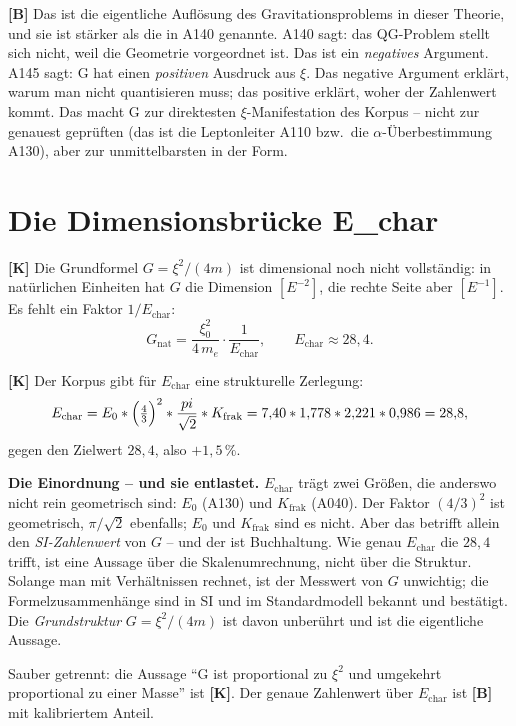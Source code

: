 \textbf{[B]} Das ist die eigentliche Auflösung des Gravitationsproblems in
dieser Theorie, und sie ist stärker als die in A140 genannte. A140 sagt: das
QG-Problem stellt sich nicht, weil die Geometrie vorgeordnet ist. Das ist ein
\emph{negatives} Argument. A145 sagt: G hat einen \emph{positiven} Ausdruck aus
$\xi$. Das negative Argument erklärt, warum man nicht quantisieren muss; das
positive erklärt, woher der Zahlenwert kommt. Das macht G zur direktesten
$\xi$-Manifestation des Korpus -- nicht zur genauest geprüften (das ist die
Leptonleiter A110 bzw.\ die $\alpha$-Überbestimmung A130), aber zur
unmittelbarsten in der Form.

\section{Die Dimensionsbrücke E\_char}

\textbf{[K]} Die Grundformel $G=\xi^2/(4m)$ ist dimensional noch nicht
vollständig: in natürlichen Einheiten hat $G$ die Dimension $[E^{-2}]$, die
rechte Seite aber $[E^{-1}]$. Es fehlt ein Faktor $1/E_\text{char}$:
\[
  G_\text{nat} = \frac{\xi_0^2}{4\,m_e}\cdot\frac{1}{E_\text{char}},
  \qquad E_\text{char}\approx 28{,}4 .
\]

\textbf{[K]} Der Korpus gibt für $E_\text{char}$ eine strukturelle Zerlegung:
\[
  E_\text{char} = E_0\cdot\Bigl(\tfrac43\Bigr)^2\cdot\frac{\pi}{\sqrt2}\cdot
  K_\text{frak} = 7{,}40\cdot 1{,}778\cdot 2{,}221\cdot 0{,}986 = 28{,}8 ,
\]
gegen den Zielwert $28{,}4$, also $+1{,}5\,\%$.

\textbf{Die Einordnung -- und sie entlastet.} $E_\text{char}$ trägt zwei Größen,
die anderswo nicht rein geometrisch sind: $E_0$ (A130) und $K_\text{frak}$
(A040). Der Faktor $(4/3)^2$ ist geometrisch, $\pi/\sqrt2$ ebenfalls; $E_0$ und
$K_\text{frak}$ sind es nicht. Aber das betrifft allein den \emph{SI-Zahlenwert}
von $G$ -- und der ist Buchhaltung. Wie genau $E_\text{char}$ die $28{,}4$
trifft, ist eine Aussage über die Skalenumrechnung, nicht über die Struktur.
Solange man mit Verhältnissen rechnet, ist der Messwert von $G$ unwichtig; die
Formelzusammenhänge sind in SI und im Standardmodell bekannt und bestätigt. Die
\emph{Grundstruktur} $G = \xi^2/(4m)$ ist davon unberührt und ist die eigentliche
Aussage.

Sauber getrennt: die Aussage \enquote{G ist proportional zu $\xi^2$ und
umgekehrt proportional zu einer Masse} ist \textbf{[K]}. Der genaue
Zahlenwert über $E_\text{char}$ ist \textbf{[B]} mit kalibriertem Anteil.

